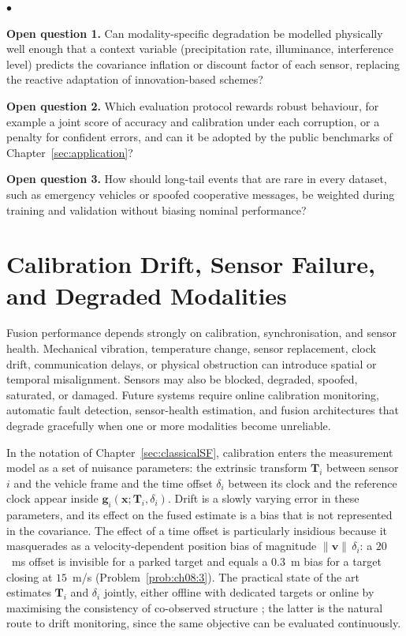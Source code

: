 \documentclass[graybox,envcountchap]{style/SNmono}
\newenvironment{list4a}{
  \begin{list}{$\bullet$}{
      \setlength{\itemsep}{0.05cm}
      \setlength{\labelsep}{0.2cm}
      \setlength{\labelwidth}{0.3cm}
      \setlength{\parsep}{0in}
      \setlength{\parskip}{0in}
      \setlength{\topsep}{0in}
      \setlength{\partopsep}{0in}
      \setlength{\leftmargin}{0.16in}}}
      {\end{list}}
\begin{document}
\begin{list4a}
    \item \textbf{Open question 1.} Can modality-specific degradation be modelled physically well enough that a context variable (precipitation rate, illuminance, interference level) predicts the covariance inflation or discount factor of each sensor, replacing the reactive adaptation of innovation-based schemes?
    \item \textbf{Open question 2.} Which evaluation protocol rewards robust behaviour, for example a joint score of accuracy and calibration under each corruption, or a penalty for confident errors, and can it be adopted by the public benchmarks of Chapter~\ref{sec:application}?
    \item \textbf{Open question 3.} How should long-tail events that are rare in every dataset, such as emergency vehicles or spoofed cooperative messages, be weighted during training and validation without biasing nominal performance?
\end{list4a}

\section{Calibration Drift, Sensor Failure, and Degraded Modalities}
\label{subsec:oc-calibration}

Fusion performance depends strongly on calibration, synchronisation, and sensor health. Mechanical vibration, temperature change, sensor replacement, clock drift, communication delays, or physical obstruction can introduce spatial or temporal misalignment. Sensors may also be blocked, degraded, spoofed, saturated, or damaged. Future systems require online calibration monitoring, automatic fault detection, sensor-health estimation, and fusion architectures that degrade gracefully when one or more modalities become unreliable.

In the notation of Chapter~\ref{sec:classicalSF}, calibration enters the measurement model as a set of nuisance parameters: the extrinsic transform $\mathbf{T}_i$ between sensor $i$ and the vehicle frame and the time offset $\delta_i$ between its clock and the reference clock appear inside $\mathbf{g}_i(\mathbf{x};\mathbf{T}_i,\delta_i)$. Drift is a slowly varying error in these parameters, and its effect on the fused estimate is a bias that is not represented in the covariance. The effect of a time offset is particularly insidious because it masquerades as a velocity-dependent position bias of magnitude $\lVert\mathbf{v}\rVert\,\delta_i$: a $20$~ms offset is invisible for a parked target and equals a $0.3$~m bias for a target closing at $15$~m/s (Problem~\ref{prob:ch08:3}). The practical state of the art estimates $\mathbf{T}_i$ and $\delta_i$ jointly, either offline with dedicated targets \cite{furgale2013_kalibr} or online by maximising the consistency of co-observed structure \cite{levinson2013_online_calibration}; the latter is the natural route to drift monitoring, since the same objective can be evaluated continuously.
\end{document}
